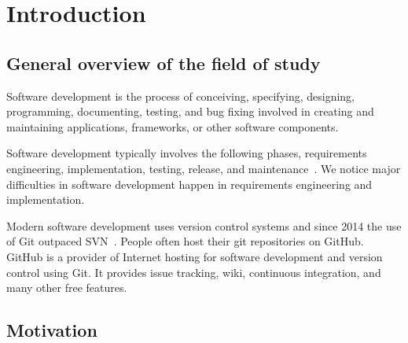 \chapter{Introduction}



\section{General overview of the field of study}
Software development is the process of conceiving, specifying, designing, programming, documenting, testing, and bug fixing involved in creating and maintaining applications, frameworks, or other software components.

Software development typically involves the following phases, requirements engineering, implementation, testing, release, and maintenance~\cite{petersen2009waterfall}. We notice major difficulties in software development happen in requirements engineering and implementation.

Modern software development uses version control systems and since 2014 the use of Git outpaced SVN~\cite{says_eclipse_2014}. People often host their git repositories on GitHub. GitHub is a provider of Internet hosting for software development and version control using Git. It provides issue tracking, wiki, continuous integration, and many other free features.

\section{Motivation}

